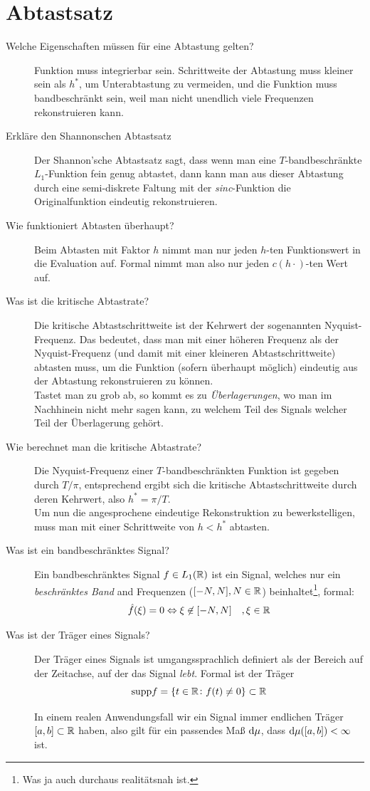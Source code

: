 \section{Abtastsatz}
\begin{description}
	\item[Welche Eigenschaften müssen für eine Abtastung gelten?]
  	Funktion muss integrierbar sein. Schrittweite der Abtastung muss kleiner sein als $ h^{*} $, um 
  	Unterabtastung zu vermeiden, und die Funktion muss bandbeschränkt sein, weil man nicht 
  	unendlich viele Frequenzen rekonstruieren kann.
	\item[Erkläre den Shannonschen Abtastsatz]
      Der Shannon'sche Abtastsatz sagt, dass wenn man eine $T$-bandbeschränkte $L_1$-Funktion fein genug
      abtastet, dann kann man aus dieser Abtastung durch eine semi-diskrete Faltung mit der \emph{sinc}-Funktion
      die Originalfunktion eindeutig rekonstruieren.
	\item[Wie funktioniert Abtasten überhaupt?]
      Beim Abtasten mit Faktor $h$ nimmt man nur jeden $h$-ten Funktionswert in die Evaluation auf.
      Formal nimmt man also nur jeden $c(h\cdot)$-ten Wert auf.
	\item[Was ist die kritische Abtastrate?]
      Die kritische Abtastschrittweite ist der Kehrwert der sogenannten Nyquist-Frequenz. Das bedeutet, dass
      man mit einer höheren Frequenz als der Nyquist-Frequenz (und damit mit einer kleineren Abtastschrittweite) 
      abtasten muss, um die Funktion (sofern überhaupt möglich) eindeutig aus der Abtastung rekonstruieren zu können.\\
      Tastet man zu grob ab, so kommt es zu \emph{Überlagerungen}, wo man im Nachhinein nicht mehr sagen kann, zu welchem
      Teil des Signals welcher Teil der Überlagerung gehört.
	\item[Wie berechnet man die kritische Abtastrate?]
      Die Nyquist-Frequenz einer $T$-bandbeschränkten Funktion ist gegeben durch $T/\pi$, entsprechend ergibt sich
      die kritische Abtastschrittweite durch deren Kehrwert, also $h^* = \pi/T$.\\
      Um nun die angesprochene eindeutige Rekonstruktion zu bewerkstelligen, muss man mit einer Schrittweite von
      $h < h^*$ abtasten.
	\item[Was ist ein bandbeschränktes Signal?]
      Ein bandbeschränktes Signal $f\in L_1(\mathbb{R})$ ist ein Signal, welches nur ein \emph{beschränktes Band} and Frequenzen
      ($[-N,N], N\in\mathbb{R}$) beinhaltet\footnote{Was ja auch durchaus realitätsnah ist.}, formal:
      $$ \hat f(\xi) = 0 \Leftrightarrow \xi \not\in [-N,N]\quad,\xi\in\mathbb{R} $$
	\item[Was ist der Träger eines Signals?]
      Der Träger eines Signals ist umgangssprachlich definiert als der Bereich auf der Zeitachse, auf der
      das Signal \emph{lebt}. Formal ist der Träger
      $$ \text{supp} f = \{t \in \mathbb{R} \colon f(t) \neq 0 \} \subset \mathbb{R} $$

      In einem realen Anwendungsfall wir ein Signal immer endlichen Träger $[a,b]\subset\mathbb{R}$ haben, 
      also gilt für ein passendes Maß $\text{d} \mu$, dass $\text{d} \mu([a,b]) < \infty$ ist.
\end{description}

